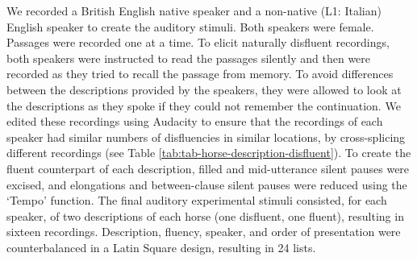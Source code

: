 \documentclass[
  man,floatsintext]{apa7}
\begin{document}
We recorded a British English native speaker and a non-native (L1: Italian) English speaker to create the auditory stimuli. Both speakers were female. Passages were recorded one at a time. To elicit naturally disfluent recordings, both speakers were instructed to read the passages silently and then were recorded as they tried to recall the passage from memory. To avoid differences between the descriptions provided by the speakers, they were allowed to look at the descriptions as they spoke if they could not remember the continuation. We edited these recordings using Audacity to ensure that the recordings of each speaker had similar numbers of disfluencies in similar locations, by cross-splicing different recordings (see Table \ref{tab:tab-horse-description-disfluent}). To create the fluent counterpart of each description, filled and mid-utterance silent pauses were excised, and elongations and between-clause silent pauses were reduced using the `Tempo' function. The final auditory experimental stimuli consisted, for each speaker, of two descriptions of each horse (one disfluent, one fluent), resulting in sixteen recordings. Description, fluency, speaker, and order of presentation were counterbalanced in a Latin Square design, resulting in 24 lists.
\end{document}
